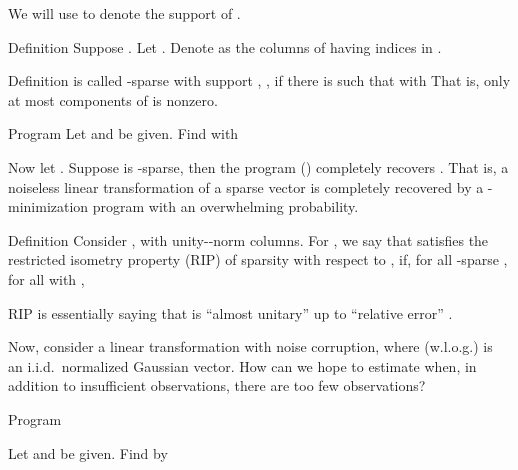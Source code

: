 We will use  to denote the support of .

\Result
{Definition}
{
Suppose .
Let .
Denote as  the columns of  having indices in .
}

\Result
{Definition}
{
 is called -sparse with support , , if there is  such that
%
with
That is, only at most  components of  is nonzero.
}

\Result
{Program}
{
Let  and  be given.
Find  with
%
}

Now let .
Suppose  is -sparse, then the program () completely recovers .
That is, a noiseless linear transformation of a sparse vector is completely recovered by a -minimization program with an overwhelming probability.

\Result
{Definition}
{
Consider , with unity--norm columns.
For , we say that  satisfies the restricted isometry property (RIP) of sparsity  with respect to , if, for all -sparse , for all  with ,
%
}

RIP is essentially saying that  is ``almost unitary'' up to ``relative error'' .

Now, consider a linear transformation with noise corruption,
%
%
where (w.l.o.g.)  is an i.i.d.\ normalized Gaussian vector.
How can we hope to estimate  when, in addition to insufficient observations, there are too few observations?

\Result
{Program}
{
Let  and  be given.
Find  by
%

}

